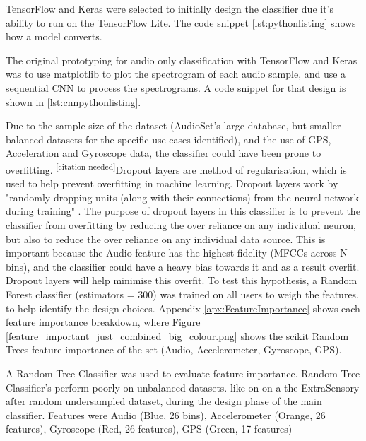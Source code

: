 \documentclass{UoNMCHA}
\newcommand{\citationneeded}{\textsuperscript{\color{blue} [citation needed]}}
\newcommand{\fref}[1] {Figure \ref{#1}}
\numberwithin{equation}{section}
\begin{document}
TensorFlow and Keras were selected to initially design the classifier due it's ability to run on the TensorFlow Lite. The code snippet \ref{lst:pythonlisting} shows how a model converts.



The original prototyping for audio only classification with TensorFlow and Keras was to use matplotlib to plot the spectrogram of each audio sample, and use a sequential CNN to process the spectrograms. A code snippet for that design is shown in \ref{lst:cnnpythonlisting}.

Due to the sample size of the dataset (AudioSet's large database, but smaller balanced datasets for the specific use-cases identified), and the use of GPS, Acceleration and Gyroscope data, the classifier could have been prone to overfitting. \citationneeded Dropout layers are method of regularisation, which is used to help prevent overfitting in machine learning. Dropout layers work by "randomly dropping units (along with their connections) from the neural network during training" \cite{witten2016data}. The purpose of dropout layers in this classifier is to prevent the classifier from overfitting by reducing the over reliance on any individual neuron, but also to reduce the over reliance on any individual data source. This is important because the Audio feature has the highest fidelity (MFCCs across N-bins), and the classifier could have a heavy bias towards it and as a result overfit. Dropout layers will help minimise this overfit. To test this hypothesis, a Random Forest classifier (estimators = 300) was trained on all users to weigh the features, to help identify the design choices. Appendix \ref{apx:FeatureImportance} shows each feature importance breakdown, where \fref{feature_important_just_combined_big_colour.png} shows the scikit Random Trees feature importance of the set (Audio, Accelerometer, Gyroscope, GPS).

A Random Tree Classifier was used to evaluate feature importance. Random Tree Classifier's perform poorly on unbalanced datasets. like on  on a the ExtraSensory after random undersampled dataset, during the design phase of the main classifier. Features were Audio (Blue, 26 bins), Accelerometer (Orange, 26 features), Gyroscope (Red, 26 features), GPS (Green, 17 features)
\end{document}
